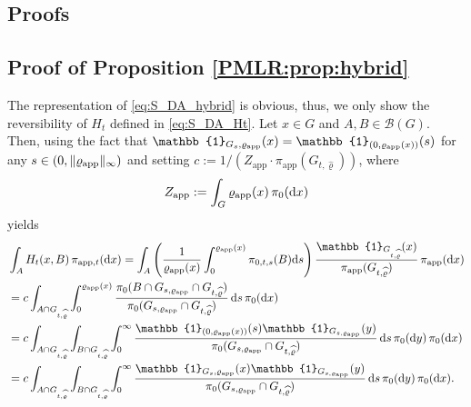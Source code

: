 \documentclass[sn-mathphys-num]{sn-jnl}%
\theoremstyle{thmstyleone}%
\theoremstyle{thmstyletwo}%
\theoremstyle{thmstylethree}%
\newcommand{\rhoapp}{\varrho_{{\rm app}}}
\begin{document}
\begin{appendices}


\section{Proofs} \label{appendix:proofs}


\subsection{Proof of Proposition \ref{PMLR:prop:hybrid}}\label{app:prop:hybrid}
The representation of \eqref{eq:S_DA_hybrid} is obvious, thus, we only show the reversibility of $H_t$ defined in \eqref{eq:S_DA_Ht}. 
Let $x\in G$ and $A,B\in\mathcal{B}(G)$. 
Then, using the fact that 
$\mathbb{1}_{G_s,\rhoapp}(x)=\mathbb{1}_{(0,\rhoapp(x))}(s)$ for any $s\in(0,\Vert \rhoapp \Vert_{\infty})$
and setting $c:=1/(Z_{\text{app}}\cdot \pi_{\text{app}}(G_{t, \widehat{\varrho}}))$, where 
\begin{align}\label{normalizing:app}
   Z_{\text{app}} :=\int_G^{} \rhoapp(x)  \, \pi_0(\mathrm{d}x)    
\end{align}
yields
\begin{align*}
	&\int_{A} H_t(x,B)  \, \pi_{\text{app},t}(\mathrm{d}x) = \int_{A} \left( \frac{1}{\rhoapp(x)} \int_{0}^{\rhoapp(x)} \pi_{0,t,s}(B) \mathrm{d}s \right) \frac{\mathbb{1}_{G_{t,\widehat{\varrho}}}(x)}{\pi_{\text{app}}(G_{t, \widehat{\varrho}})}  \, \pi_{\text{app}}(\mathrm{d}x) \\
	&= c \int_{A\cap G_{t,\widehat{\varrho}}} \int_{0}^{\rhoapp(x)} \frac{\pi_0(B \cap G_{s,\rhoapp} \cap  G_{t,\widehat{\varrho}})}{\pi_0(G_{s,\rhoapp} \cap G_{t,\widehat{\varrho}})}
	 \, \mathrm{d}s  \, \pi_0(\mathrm{d}x) \\
	&= c  \int_{A\cap G_{t,\widehat{\varrho}}} \int_{B\cap G_{t,\widehat{\varrho}}} \int_{0}^{\infty}  \frac{\mathbb{1}_{(0,\rhoapp(x))}(s) \mathbb{1}_{G_{s,\rhoapp}}(y)}{\pi_0(G_{s,\rhoapp} \cap G_{t,\widehat{\varrho}})}  \, \mathrm{d}s  \, \pi_0(\mathrm{d}y)  \, \pi_0(\mathrm{d}x) \\
	&= c  \int_{A\cap G_{t,\widehat{\varrho}}} \int_{B\cap G_{t,\widehat{\varrho}}} \int_{0}^{\infty}  \frac{\mathbb{1}_{G_s,\rhoapp}(x) \mathbb{1}_{G_{s,\rhoapp}}(y)}{\pi_0(G_{s,\rhoapp} \cap G_{t,\widehat{\varrho}})}  \, \mathrm{d}s  \, \pi_0(\mathrm{d}y)  \, \pi_0(\mathrm{d}x).

\end{align*}
\end{appendices}
\end{document}
